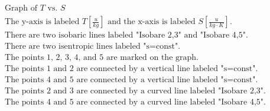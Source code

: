 

\item[a)] 
    \[
    \begin{array}{c}
    \text{Graph of } T \text{ vs. } S \\
    \text{The y-axis is labeled } T \left[ \frac{u}{kg} \right] \text{ and the x-axis is labeled } S \left[ \frac{u}{kg \cdot K} \right]. \\
    \text{There are two isobaric lines labeled "Isobare 2,3" and "Isobare 4,5".} \\
    \text{There are two isentropic lines labeled "s=const".} \\
    \text{The points 1, 2, 3, 4, and 5 are marked on the graph.} \\
    \text{The points 1 and 2 are connected by a vertical line labeled "s=const".} \\
    \text{The points 4 and 5 are connected by a vertical line labeled "s=const".} \\
    \text{The points 2 and 3 are connected by a curved line labeled "Isobare 2,3".} \\
    \text{The points 4 and 5 are connected by a curved line labeled "Isobare 4,5".} \\
    \end{array}
    \]